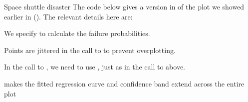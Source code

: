\documentclass[11pt]{book}
\renewenvironment{knitrout}{\small\renewcommand{\baselinestretch}{.85}}{} %
\begin{document}
\begin{Example}{Space shuttle disaster}
The code below gives a  version in 
of the plot we showed earlier in  ().
The relevant details here are:
\begin{itemize*}
  \item We specify  to calculate the failure probabilities.
  \item Points are jittered in the call to  to prevent overplotting.
  \item In the call to , we need to use ,
  just as in the call to  above.
  \item {} makes the fitted regression curve and
  confidence band extend across the entire plot
\end{itemize*}
\begin{knitrout}
\color{fgcolor}\begin{kframe}
\begin{alltt}
 \hlstd{(}    \hlopt{/}  \hlopt{+}
  \hlstd{(}\hlstd{,} \hlstd{)} \hlopt{+} \hlstd{()} \hlopt{+}
  \hlstd{(}\hlstd{)} \hlopt{+}
  \hlstd{(}\hlstd{)} \hlopt{+}
  \hlstd{(}\hlstd{=}\hlstd{(}\hlstd{=}\hlstd{,} \hlstd{=}\hlstd{),}
             \hlstd{(} \hlstd{=} \hlstd{))} \hlopt{+}
  \hlstd{(}\hlstd{=}\hlstd{)} \hlopt{+}
  \hlstd{(} \hlstd{=} \hlstd{,}   \hlstd{=}\hlstd{,}
              \hlstd{(}   \hlstd{=} \hlstd{,} \hlstd{=}\hlstd{,} \hlstd{=}\hlstd{)}
\end{alltt}
\end{kframe}
\end{knitrout}


\end{Example}
\end{document}

